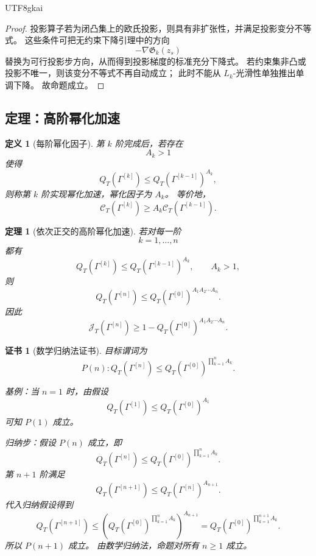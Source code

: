 \documentclass[12pt]{article}
\newtheorem{definition}{定义}[section]
\newtheorem{theorem}{定理}[section]
\newtheorem{Certificate}{证书}[section]
\begin{document}
\begin{CJK*}{UTF8}{gkai}
\begin{proof}
投影算子若为闭凸集上的欧氏投影，则具有非扩张性，并满足投影变分不等式。
这些条件可把无约束下降引理中的方向
\[
  -\nabla\mathfrak G_k(z_s)
\]
替换为可行投影步方向，从而得到投影梯度的标准充分下降式。
若约束集非凸或投影不唯一，则该变分不等式不再自动成立；
此时不能从 \(L_k\)-光滑性单独推出单调下降。
故命题成立。
\end{proof}

\subsection{定理：高阶幂化加速}
\label{subsec:tex55-jacgap-high-order-power}

\begin{definition}[每阶幂化因子]
\label{def:tex55-jacgap-power-factor}
第 \(k\) 阶完成后，若存在
\[
  A_k>1
\]
使得
\[
  Q_T(\Gamma^{[k]})
  \le
  Q_T(\Gamma^{[k-1]})^{A_k},
\]
则称第 \(k\) 阶实现幂化加速，幂化因子为 \(A_k\)。
等价地，
\[
  \mathcal C_T(\Gamma^{[k]})
  \ge
  A_k\mathcal C_T(\Gamma^{[k-1]}).
\]
\end{definition}

\begin{theorem}[依次正交的高阶幂化加速]
\label{thm:tex55-jacgap-high-order-power}
若对每一阶
\[
  k=1,\ldots,n
\]
都有
\[
  Q_T(\Gamma^{[k]})
  \le
  Q_T(\Gamma^{[k-1]})^{A_k},
  \qquad
  A_k>1,
\]
则
\[
  \boxed{
  Q_T(\Gamma^{[n]})
  \le
  Q_T(\Gamma^{[0]})^{A_1A_2\cdots A_n}.
  }
\]
因此
\[
  \boxed{
  \mathcal J_T(\Gamma^{[n]})
  \ge
  1-
  Q_T(\Gamma^{[0]})^{A_1A_2\cdots A_n}.
  }
\]
\end{theorem}

\begin{Certificate}[数学归纳法证书]
\label{cert:tex55-jacgap-high-order-power}
目标谓词为
\[
  P(n):
  Q_T(\Gamma^{[n]})
  \le
  Q_T(\Gamma^{[0]})^{\prod_{k=1}^{n}A_k}.
\]

基例：当 \(n=1\) 时，由假设
\[
  Q_T(\Gamma^{[1]})
  \le
  Q_T(\Gamma^{[0]})^{A_1}
\]
可知 \(P(1)\) 成立。

归纳步：假设 \(P(n)\) 成立，即
\[
  Q_T(\Gamma^{[n]})
  \le
  Q_T(\Gamma^{[0]})^{\prod_{k=1}^{n}A_k}.
\]
第 \(n+1\) 阶满足
\[
  Q_T(\Gamma^{[n+1]})
  \le
  Q_T(\Gamma^{[n]})^{A_{n+1}}.
\]
代入归纳假设得到
\[
  Q_T(\Gamma^{[n+1]})
  \le
  \left(
  Q_T(\Gamma^{[0]})^{\prod_{k=1}^{n}A_k}
  \right)^{A_{n+1}}
  =
  Q_T(\Gamma^{[0]})^{\prod_{k=1}^{n+1}A_k}.
\]
所以 \(P(n+1)\) 成立。
由数学归纳法，命题对所有 \(n\ge1\) 成立。
\end{Certificate}


\end{CJK*}
\end{document}
